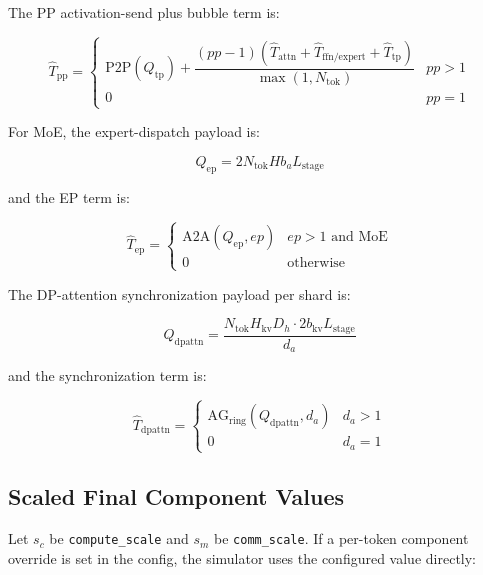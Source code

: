 The PP activation-send plus bubble term is:

\begin{equation*}
\widehat{T}_{\mathrm{pp}} =
\begin{cases}
\mathrm{P2P}(Q_{\mathrm{tp}}) +
\dfrac{(pp - 1)
\left(
\widehat{T}_{\mathrm{attn}} +
\widehat{T}_{\mathrm{ffn/expert}} +
\widehat{T}_{\mathrm{tp}}
\right)}
{\max(1, N_{\mathrm{tok}})} & pp > 1 \\
0 & pp = 1
\end{cases}
\end{equation*}

For MoE, the expert-dispatch payload is:

\begin{equation*}
Q_{\mathrm{ep}} = 2 N_{\mathrm{tok}} H b_a L_{\mathrm{stage}}
\end{equation*}

and the EP term is:

\begin{equation*}
\widehat{T}_{\mathrm{ep}} =
\begin{cases}
\mathrm{A2A}(Q_{\mathrm{ep}}, ep) & ep > 1 \text{ and MoE} \\
0 & \text{otherwise}
\end{cases}
\end{equation*}

The DP-attention synchronization payload per shard is:

\begin{equation*}
Q_{\mathrm{dpattn}} =
\frac{N_{\mathrm{tok}} H_{\mathrm{kv}} D_h \cdot 2 b_{\mathrm{kv}} L_{\mathrm{stage}}}
{d_a}
\end{equation*}

and the synchronization term is:

\begin{equation*}
\widehat{T}_{\mathrm{dpattn}} =
\begin{cases}
\mathrm{AG}_{\mathrm{ring}}(Q_{\mathrm{dpattn}}, d_a) & d_a > 1 \\
0 & d_a = 1
\end{cases}
\end{equation*}

\subsection{Scaled Final Component Values}

Let \(s_c\) be \texttt{compute\_scale} and \(s_m\) be \texttt{comm\_scale}. If a
per-token component override is set in the config, the simulator uses the
configured value directly:

